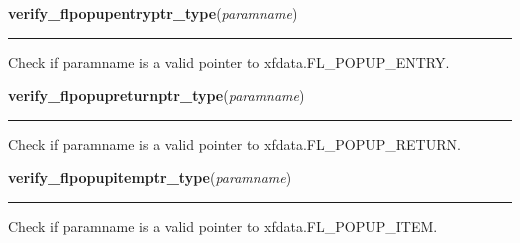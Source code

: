     \label{xformslib:library:verify_flpopupentryptr_type}

    \vspace{0.5ex}

\hspace{.8\funcindent}\begin{boxedminipage}{\funcwidth}

    \raggedright \textbf{verify\_flpopupentryptr\_type}(\textit{paramname})

    \vspace{-1.5ex}

    \rule{\textwidth}{0.5\fboxrule}
\setlength{\parskip}{2ex}

Check if paramname is a valid pointer to xfdata.FL\_POPUP\_ENTRY.
\setlength{\parskip}{1ex}
    \end{boxedminipage}

    \label{xformslib:library:verify_flpopupreturnptr_type}

    \vspace{0.5ex}

\hspace{.8\funcindent}\begin{boxedminipage}{\funcwidth}

    \raggedright \textbf{verify\_flpopupreturnptr\_type}(\textit{paramname})

    \vspace{-1.5ex}

    \rule{\textwidth}{0.5\fboxrule}
\setlength{\parskip}{2ex}

Check if paramname is a valid pointer to xfdata.FL\_POPUP\_RETURN.
\setlength{\parskip}{1ex}
    \end{boxedminipage}

    \label{xformslib:library:verify_flpopupitemptr_type}

    \vspace{0.5ex}

\hspace{.8\funcindent}\begin{boxedminipage}{\funcwidth}

    \raggedright \textbf{verify\_flpopupitemptr\_type}(\textit{paramname})

    \vspace{-1.5ex}

    \rule{\textwidth}{0.5\fboxrule}
\setlength{\parskip}{2ex}

Check if paramname is a valid pointer to xfdata.FL\_POPUP\_ITEM.
\setlength{\parskip}{1ex}
    \end{boxedminipage}

